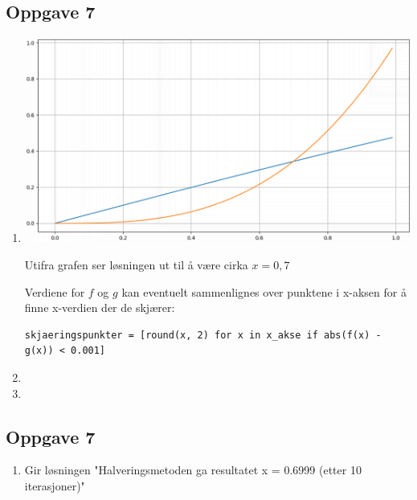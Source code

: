 \documentclass[11pt,a4paper]{report}
\newcommand{\opgd}[1]{\item[#1)]}
\newcommand{\opg}[1]{\subsection*{Oppgave #1}}
\begin{document}
\newpage
\opg{7}
\begin{enumerate}[leftmargin=*,itemsep=0.75cm,labelsep=1.5em,label=\alph*)]
\opgd{a}

\begin{center}
\includegraphics[scale=0.4]{7a.png}
\end{center}
Utifra grafen ser løsningen ut til å være cirka $x = 0,7$

Verdiene for $f$ og $g$ kan eventuelt sammenlignes over punktene i x-aksen for å finne x-verdien der de skjærer:
\begin{lstlisting}
skjaeringspunkter = [round(x, 2) for x in x_akse if abs(f(x) - g(x)) < 0.001]
\end{lstlisting}

\opgd{b}


\opgd{c}

\end{enumerate}

\newpage
\opg{7}
\begin{enumerate}[leftmargin=*,itemsep=0.75cm,labelsep=1.5em,label=\alph*)]
\opgd{d}

Gir løsningen "Halveringsmetoden ga resultatet x = 0.6999 (etter 10 iterasjoner)"
\end{enumerate}

\end{document}
